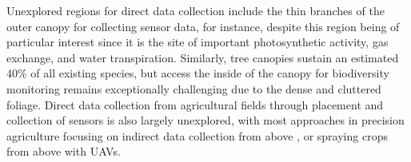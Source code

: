 Unexplored regions for direct data collection include the thin branches of the outer canopy for collecting sensor data, for instance, despite this region being of particular interest since it is the site of important photosynthetic activity, gas exchange, and water transpiration. 
Similarly, tree canopies sustain an estimated 40\% of all existing species, but access the inside of the canopy for biodiversity monitoring remains exceptionally challenging due to the dense and cluttered foliage. %
Direct data collection from agricultural fields through placement and collection of sensors is also largely unexplored, with most approaches in precision agriculture focusing on indirect data collection from above \cite{Zhang2022}, or spraying crops from above with UAVs\cite{Tsouros2019}.


